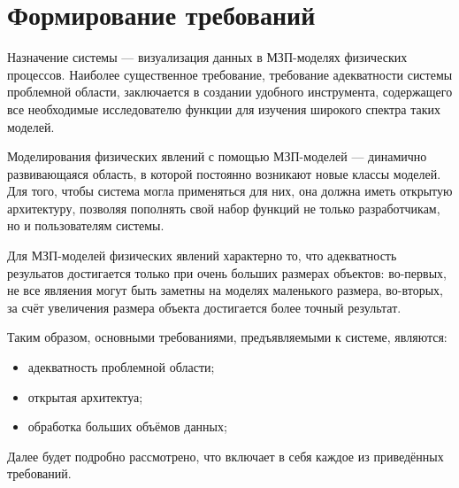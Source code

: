 \documentclass[a4paper,12pt]{extarticle}
\let\stdsection\section
\renewcommand\section{
    \newpage
    \stdsection
}
\begin{document}
\section{Формирование требований}
\label{sec:requirements}

Назначение системы --- визуализация данных в МЗП-моделях физических процессов.  Наиболее существенное требование, требование адекватности системы проблемной области, заключается в создании удобного инструмента, содержащего все необходимые исследователю функции для изучения широкого спектра таких моделей.

Моделирования физических явлений с помощью МЗП-моделей --- динамично развивающаяся область, в которой постоянно возникают новые классы моделей. Для того, чтобы система могла применяться для них, она должна иметь открытую архитектуру, позволяя пополнять свой набор функций не только разработчикам, но и пользователям системы. 

Для МЗП-моделей физических явлений характерно то, что адекватность резульатов достигается только при очень больших размерах объектов: во-первых, не все являения могут быть заметны на моделях маленького размера, во-вторых, за счёт увеличения размера объекта достигается более точный результат.

Таким образом, основными требованиями, предъявляемыми к системе, являются:
\begin{itemize}
    \item адекватность проблемной области;
    \item открытая архитектуа;
    \item обработка больших объёмов данных;
\end{itemize}

Далее будет подробно рассмотрено, что включает в себя каждое из приведённых требований.
\end{document}

